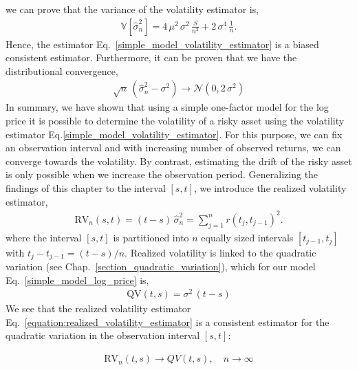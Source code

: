 \documentclass[11pt, a4paper]{thesis}  %
\begin{document}
% 
we can prove that the variance of the volatility estimator is, 
%
\begin{eqnarray}
	\mathbb{V}\left[\hat{\sigma}^2_n\right]
	= 4\,\mu^2\,\sigma^2\,\frac{S}{n^2}+2\,\sigma^4\,\frac{1}{n}.
\end{eqnarray}
%
Hence, the estimator Eq.~\ref{simple_model_volatility_estimator} is a biased consistent estimator. Furthermore, it can be proven that we have the distributional convergence, 
%
\begin{eqnarray}
	\sqrt{n}\,\left(\hat{\sigma}^2_n - \sigma^2\right) 
	\rightarrow \mathcal{N}(0,2\,\sigma^2)
	\label{simple_model_distributional_convergence}
\end{eqnarray}
%
%
In summary, we have shown that using a simple one-factor model for the log price it is possible to determine the volatility of a risky asset using the volatility estimator Eq.\ref{simple_model_volatility_estimator}. For this purpose, we can fix an observation interval and with increasing number of observed returns, we can converge towards the volatility. By contrast, estimating the drift of the risky asset is only possible when we increase the observation period. Generalizing the findings of this chapter to the interval $[s,t]$, we introduce the realized volatility estimator, 
%
\begin{eqnarray}
	\textrm{RV}_n(s,t) = (t - s)\,\hat{\sigma}^2_n
							 = \sum_{j=1}^{n} r\left(t_j, t_{j-1}\right)^2.
	\label{equation:realized_volatility_estimator}
\end{eqnarray} 
%
where the interval $[s,t]$ is partitioned into $n$ equally sized intervals $[t_{j-1}, t_j]$ with $t_j-t_{j-1} = (t-s)/n$. Realized volatility is linked to the quadratic variation (see Chap.~\ref{section_quadratic_variation}), which for our model Eq.~\ref{simple_model_log_price} is,
%
\begin{eqnarray}
	\textrm{QV}(t,s) = \sigma^2\,(t-s)
\end{eqnarray}
% 
We see that the realized volatility estimator Eq.~\ref{equation:realized_volatility_estimator} is a consistent estimator for the quadratic variation in the observation interval $[s,t]$:

\begin{eqnarray}
	\textrm{RV}_n(t,s) \rightarrow	QV(t,s),\quad n\rightarrow\infty
\end{eqnarray}
\end{document}
